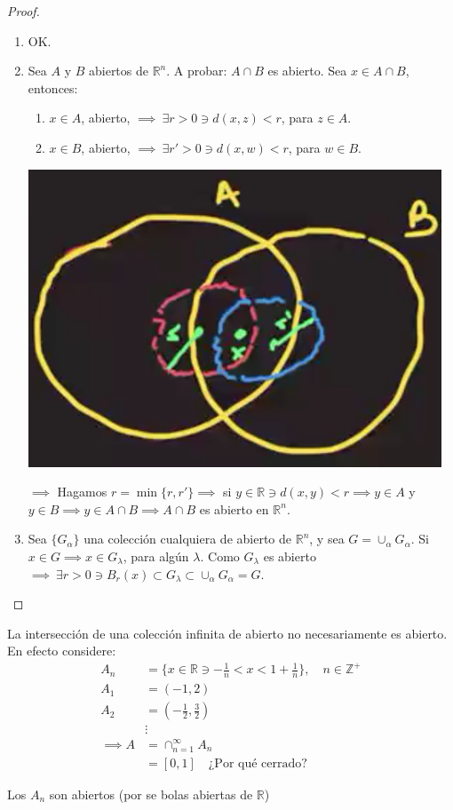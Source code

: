 \begin{proof}
	\begin{enumerate}
	\item OK. 
	\item Sea $A$ y $B$ abiertos de $\mathbb{R}^n$. A probar: $A\cap B$ es abierto. Sea $x\in A\cap B$, entonces: 
	\begin{enumerate}
		\item $x\in A$, abierto, $\implies \ \exists r>0\ni d(x,z)<r$, para $z\in A$. 
		\item $x\in B$, abierto, $\implies \ \exists r'>0\ni d(x,w)<r$, para $w\in B$.  
	\end{enumerate}
	\begin{center}
	\includegraphics[scale=0.4]{images/2/5}
\end{center}
	$\implies$ Hagamos $r=\min\{r,r'\}\implies $ si $y\in \mathbb{R}\ni d(x,y)<r\implies y\in A$ y $y\in B\implies y\in A\cap B\implies A\cap B$ es abierto en $\mathbb{R}^n$. 
	
	\item Sea $\{G_\alpha\}$ una colección cualquiera de abierto de $\mathbb{R}^n$, y sea $G=\cup_{\alpha} G_\alpha$. Si $x\in G\implies x\in G_\lambda$, para algún $\lambda$. Como $G_\lambda$ es abierto $\implies \ \exists r>0 \ni B_r(x)\subset G_\lambda \subset \cup_\alpha G_\alpha =G$. 
		\end{enumerate}
\end{proof}

\begin{nota}
	La intersección de una colección infinita de abierto no necesariamente es abierto. En efecto considere: 
	\begin{align*}
		A_n &= \{x\in\mathbb{R}\ni -\frac{1}{n}<x<1+\frac{1}{n}\}, \quad n\in\mathbb{Z}^+\\
		A_1 &= (-1,2)\\
		A_2 &= \left(-\frac{1}{2}, \frac{3}{2}\right)\\
		&\vdots\\
		\implies A &= \cap_{n=1}^\infty A_n\\
	&= [0,1]\quad \text{¿Por qué cerrado?}
		\end{align*}
	
	\begin{cajita}
		Los $A_n$ son abiertos (por se bolas abiertas de $\mathbb{R}$)
	\end{cajita}
\end{nota}

